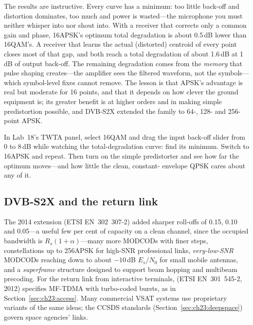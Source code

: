 
The results are instructive. Every curve has a minimum: too little back-off and distortion
dominates, too much and power is wasted---the microphone you must neither whisper into nor shout
into. With a receiver that corrects only a common gain and phase, 16APSK's optimum total
degradation is about 0.5\,dB lower than 16QAM's. A receiver that learns the actual (distorted)
centroid of every point closes most of that gap, and both reach a total degradation of about
1.6\,dB at 1\,dB of output back-off. The remaining degradation comes from the \emph{memory} that
pulse shaping creates---the amplifier sees the filtered waveform, not the symbols---which
symbol-level fixes cannot remove. The lesson is that APSK's advantage is real but moderate for 16
points, and that it depends on how clever the ground equipment is; its greater benefit is at
higher orders and in making simple predistortion possible, and DVB-S2X extended the family to 64-,
128- and 256-point APSK.

\begin{tryit}
In Lab~18's TWTA panel, select 16QAM and drag the input back-off slider from 0 to 8\,dB while
watching the total-degradation curve: find its minimum. Switch to 16APSK and repeat. Then turn on
the simple predistorter and see how far the optimum moves---and how little the clean, constant-
envelope QPSK cares about any of it.
\end{tryit}

\subsection{DVB-S2X and the return link}

The 2014 extension  (ETSI EN~302~307-2) added sharper roll-offs of 0.15, 0.10 and
0.05---a useful few per cent of capacity on a clean channel, since the occupied bandwidth is
$R_s(1+\alpha)$---many more MODCODs with finer steps, constellations up to 256APSK for
high-SNR professional links, \emph{very-low-SNR} MODCODs reaching down to about $-10$\,dB $E_s/N_0$
for small mobile antennas, and a \emph{superframe} structure designed to support beam hopping and
multibeam precoding. For the return link from interactive terminals, 
(ETSI EN~301~545-2, 2012) specifies MF-TDMA with turbo-coded bursts, as in
Section~\ref{sec:ch23:access}. Many commercial VSAT systems use proprietary variants of the same
ideas; the CCSDS standards (Section~\ref{sec:ch23:deepspace}) govern space agencies' links.

